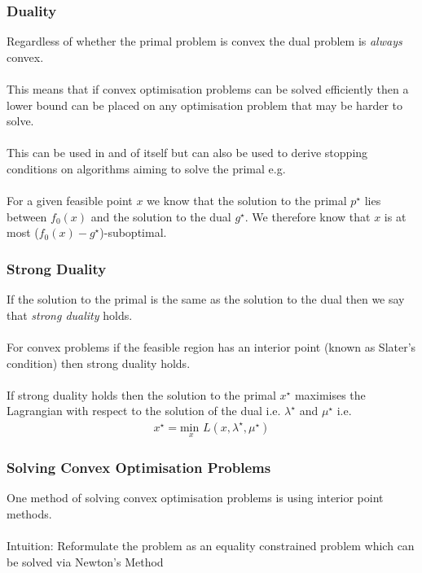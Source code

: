 \documentclass{beamer}
\begin{document}
\begin{frame}
    \frametitle{Duality}
    Regardless of whether the primal problem is convex the dual problem is
    \textit{always} convex.
    \\~\\
    This means that if convex optimisation problems can be solved efficiently
    then a lower bound can be placed on any optimisation problem that may be
    harder to solve.
    \\~\\
    This can be used in and of itself but can also be used to derive stopping
    conditions on algorithms aiming to solve the primal e.g.
    \\~\\
    For a given
    feasible point $x$ we know that the solution to the primal $p^{\star}$ lies
    between $f_{0}(x)$ and the solution to the dual $g^{\star}$. We therefore know that $x$
    is at most ($f_{0}(x) - g^{\star}$)-suboptimal.
\end{frame}

\begin{frame}
    \frametitle{Strong Duality}
    If the solution to the primal is the same as the solution to the dual
    then we say that \textit{strong duality} holds.
    \\~\\
    For convex problems if the feasible region has an interior point (known as
    Slater's condition) then strong duality holds.
    \\~\\
    If strong duality holds then the solution to the primal $x^{\star}$
    maximises the Lagrangian with respect to the solution of the dual i.e.
    $\lambda^{\star}$ and $\mu^{\star}$ i.e.
    \begin{align*}
        x^{\star} = \underset{x}{\text{min }} L(x, \lambda^{\star}, \mu^{\star})
    \end{align*}
\end{frame}

\begin{frame}
    \frametitle{Solving Convex Optimisation Problems}
    One method of solving convex optimisation problems is using interior point
    methods.
    \\~\\
    Intuition: Reformulate the problem as an equality constrained problem which
    can be solved via Newton's Method
\end{frame}
\end{document}
